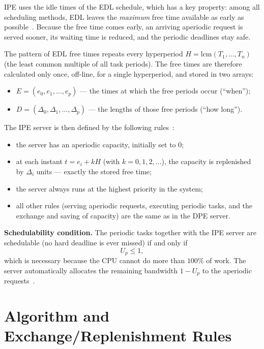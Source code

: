\documentclass[conference]{IEEEtran}
\begin{document}
IPE uses the idle times of the EDL schedule, which has a key property: among
all scheduling methods, EDL leaves the \emph{maximum} free time available as
early as possible~\cite{cc1989}. Because the free time comes early, an
arriving aperiodic request is served sooner, its waiting time is reduced, and
the periodic deadlines stay safe.

The pattern of EDL free times repeats every hyperperiod
$H = \mathrm{lcm}(T_1,\dots,T_n)$ (the least common multiple of all task
periods). The free times are therefore calculated only once, off-line, for a
single hyperperiod, and stored in two arrays:
\begin{itemize}
  \item $E = (e_0, e_1, \dots, e_p)$ --- the times at which the free periods
        occur (``when'');
  \item $D = (\Delta_0, \Delta_1, \dots, \Delta_p)$ --- the lengths of those
        free periods (``how long'').
\end{itemize}

The IPE server is then defined by the following rules~\cite{spuri1996}:
\begin{itemize}
  \item the server has an aperiodic capacity, initially set to $0$;
  \item at each instant $t = e_i + kH$ (with $k = 0, 1, 2, \dots$), the
        capacity is replenished by $\Delta_i$ units --- exactly the stored
        free time;
  \item the server always runs at the highest priority in the system;
  \item all other rules (serving aperiodic requests, executing periodic tasks,
        and the exchange and saving of capacity) are the same as in the DPE
        server.
\end{itemize}

\noindent\textbf{Schedulability condition.} The periodic tasks together with
the IPE server are schedulable (no hard deadline is ever missed) if and only
if
\begin{equation}
  U_p \leq 1 ,
\end{equation}
which is necessary because the CPU cannot do more than $100\%$ of work. The
server automatically allocates the remaining bandwidth $1 - U_p$ to the
aperiodic requests~\cite{spuri1996}.

\section{Algorithm and Exchange/Replenishment Rules}
\end{document}
